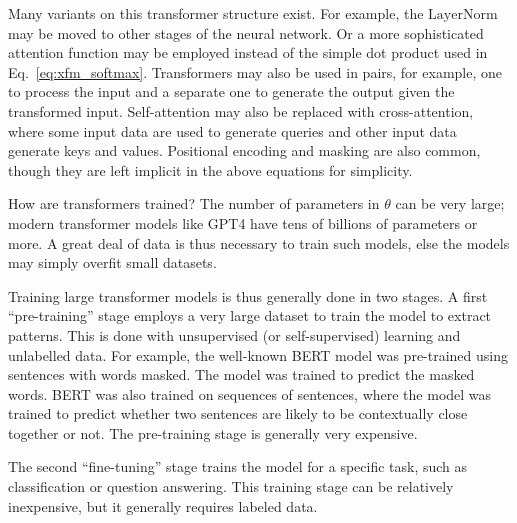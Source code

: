 Many variants on this transformer structure exist.  For example, the $\text{LayerNorm}$ may be moved to other stages of the neural network.  Or a more sophisticated attention function may be employed instead of the simple dot product used in Eq.~\ref{eq:xfm_softmax}.  Transformers may also be used in pairs, for example, one to process the input and a separate one to generate the output given the transformed input.  Self-attention may also be replaced with cross-attention, where some input data are used to generate queries and other input data generate keys and values.  Positional encoding and masking are also common, though they are left implicit in the above equations for simplicity.

How are transformers trained?  The number of parameters in $\theta$ can be very large; modern transformer models like GPT4 have tens of billions of parameters or more.  A great deal of data is thus necessary to train such models, else the models may simply overfit small datasets.

Training large transformer models is thus generally done in two stages.  A first ``pre-training'' stage employs a very large dataset to train the model to extract patterns.  This is done with unsupervised (or self-supervised) learning and unlabelled data.  For example, the well-known BERT model was pre-trained using sentences with words masked.  The model was trained to predict the masked words.  BERT was also trained on sequences of sentences, where the model was trained to predict whether two sentences are likely to be contextually close together or not. The pre-training stage is generally very expensive.

The second ``fine-tuning'' stage trains the model for a specific task, such as classification or question answering.  This training stage can be relatively inexpensive, but it generally requires labeled data.




